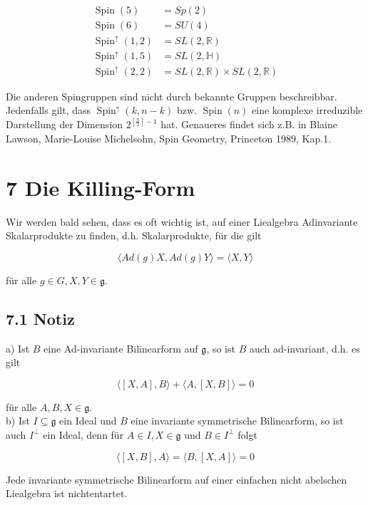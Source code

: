 \documentclass[10pt, letterpaper]{article}
\begin{document}
$$
\begin{aligned}
\operatorname{Spin}(5) & =S p(2) \\
\operatorname{Spin}(6) & =S U(4) \\
\operatorname{Spin}^{\uparrow}(1,2) & =S L(2, \mathbb{R}) \\
\operatorname{Spin}^{\uparrow}(1,5) & =S L(2, \mathbb{H}) \\
\operatorname{Spin}^{\uparrow}(2,2) & =S L(2, \mathbb{R}) \times S L(2, \mathbb{R})
\end{aligned}
$$

Die anderen Spingruppen sind nicht durch bekannte Gruppen beschreibbar. Jedenfalls gilt, dass $\operatorname{Spin}^{\uparrow}(k, n-k)$ bzw. $\operatorname{Spin}(n)$ eine komplexe irreduzible Darstellung der Dimension $2^{\left[\frac{n}{2}\right]-1}$ hat. Genaueres findet sich z.B. in Blaine Lawson, Marie-Louise Michelsohn, Spin Geometry, Princeton 1989, Kap.1.


\pagebreak

\section{7 Die Killing-Form}
Wir werden bald sehen, dass es oft wichtig ist, auf einer Liealgebra Adinvariante Skalarprodukte zu finden, d.h. Skalarprodukte, für die gilt

$$
\langle A d(g) X, A d(g) Y\rangle=\langle X, Y\rangle
$$

für alle $g \in G, X, Y \in \mathfrak{g}$.

\subsection*{7.1 Notiz}
a) Ist $B$ eine Ad-invariante Bilinearform auf $\mathfrak{g}$, so ist $B$ auch ad-invariant, d.h. es gilt

$$
\langle[X, A], B\rangle+\langle A,[X, B]\rangle=0
$$

für alle $A, B, X \in \mathfrak{g}$.\\
b) Ist $I \subseteq \mathfrak{g}$ ein Ideal und $B$ eine invariante symmetrische Bilinearform, so ist auch $I^{\perp}$ ein Ideal, denn für $A \in I, X \in \mathfrak{g}$ und $B \in I^{\perp}$ folgt

$$
\langle[X, B], A\rangle=\langle B,[X, A]\rangle=0
$$

Jede invariante symmetrische Bilinearform auf einer einfachen nicht abelschen Liealgebra ist nichtentartet.
\end{document}
